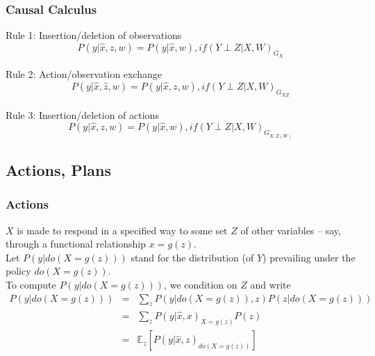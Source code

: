 \documentclass{beamer}
\begin{document}
\begin{frame}
\frametitle{Causal Calculus}
\begin{block}{Rule 1: Insertion/deletion of observations}
\begin{equation}
P(y|\hat{x},z,w) = P(y|\hat{x},w), if (Y \perp Z |X,W)_{G_{\overline{X}}}
\end{equation}
\end{block}

\begin{block}{Rule 2: Action/observation exchange}
\begin{equation}
P(y|\hat{x},\hat{z},w) = P(y|\hat{x},z,w), if (Y \perp Z |X,W)_{G_{\overline{X}\underline{Z}}}
\end{equation}
\end{block}

\begin{block}{Rule 3: Insertion/deletion of actions}
\begin{equation}
P(y|\hat{x},z,w) = P(y|\hat{x},w), if (Y \perp Z |X,W)_{G_{\overline{X},\overline{Z(W)}}}
\end{equation}
\end{block}

\end{frame}



\subsection{Actions, Plans}

\begin{frame}
\frametitle{Actions}
$X$ is made to respond in a specified way to some set $Z$ of other
variables – say, through a functional relationship $x = g(z)$.\\
Let $P(y | do(X = g(z)))$ stand for the distribution (of $Y$)
prevailing under the policy $do(X = g(z))$. \\
To compute $P(y | do(X = g(z)))$, we condition on $Z$ and write
$$
\begin{array}{lcl}
P(y | do(X = g(z))) &=&  \sum_z P(y | do(X = g(z)), z) P(z| do(X = g(z)))\\
&=& \sum_z P(y |\hat{x},x)_{X = g(z)} P(z) \\
&=& \mathbb{E}_z[P(y | \hat{x},z)_{do(X = g(z))}] 
\end{array}
$$
\end{frame}
\end{document}
